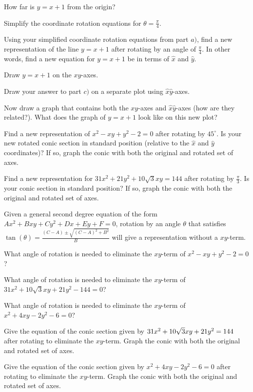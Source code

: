 \bq
\be
\item How far is $y=x+1$ from the origin?
\item Simplify the coordinate rotation equations for $\theta =\frac{\pi}{4}$.
\item Using your simplified coordinate rotation equations from part $a)$, find a new representation of the line $y=x+1$ after rotating by an angle of $\frac{\pi}{4}$. In other words, find a new equation for $y=x+1$ be in terms of $\hat{x}$ and $\hat{y}$.
\item Draw $y=x+1$ on the $xy$-axes.
\item Draw your answer to part $c)$ on a separate plot using $\hat{x}\hat{y}$-axes.
\item Now draw a graph that contains both the $xy$-axes and $\hat{x}\hat{y}$-axes (how are they related?). What does the graph of $y=x+1$ look like on this new plot?
\ee
\eq

\question Find a new representation of $x^2-xy+y^2-2=0$ after rotating by $45^{\circ}$. Is your new rotated conic section in standard position (relative to the $\widehat{x}$ and $\widehat{y}$ coordinates)? If so, graph the conic with both the original and rotated set of axes.

\question Find a new representation for $31x^2+21y^2+10\sqrt{3}xy=144$ after rotating by $\frac{\pi}{3}$. Is your conic section in standard position? If so, graph the conic with both the original and rotated set of axes.

\begin{info} Given a general second degree equation of the form $Ax^2+Bxy+Cy^2+Dx+Ey+F=0$, rotation by an angle $\theta$ that satisfies
$\tan(\theta) = \frac{(C-A)\pm \sqrt{(C-A)^2+B^2}}{B}$ will give a representation without a $xy$-term.
\end{info}

\question What angle of rotation is needed to eliminate the $xy$-term of $x^2-xy+y^2-2=0$?

\question What angle of rotation is needed to eliminate the $xy$-term of $31x^2+10\sqrt{3}xy+21y^2-144=0$?

\question What angle of rotation is needed to eliminate the $xy$-term of $x^2+4xy-2y^2-6=0$?

\question Give the equation of the conic section given by $31x^2+ \break10\sqrt{3}xy +21y^2 =144$ after rotating to eliminate the $xy$-term. Graph the conic with both the original and rotated set of axes.

\question Give the equation of the conic section given by $x^2+4xy-2y^2-6=0$ after rotating to eliminate the $xy$-term. Graph the conic with both the original and rotated set of axes.

